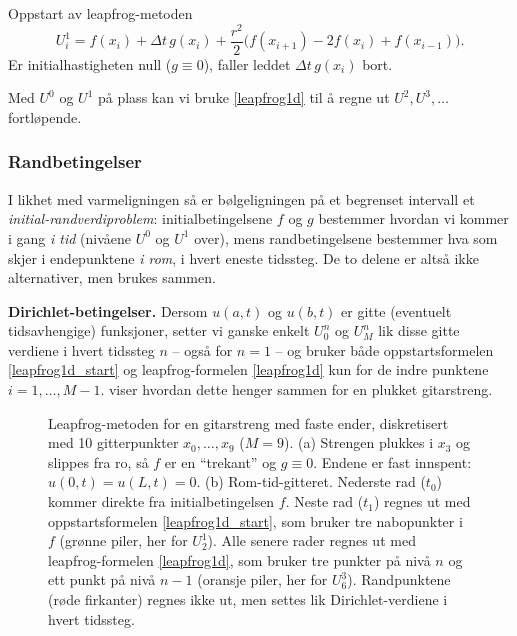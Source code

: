 \begin{oppsum}{Oppstart av leapfrog-metoden}
\begin{equation}\label{leapfrog1d_start}
U_i^1 = f(x_i) + \Delta t\, g(x_i) + \frac{r^2}{2}\big(f(x_{i+1})-2f(x_i)+f(x_{i-1})\big).
\end{equation}
Er initialhastigheten null ($g\equiv 0$), faller leddet $\Delta t\,g(x_i)$ bort.
\end{oppsum}

Med $U^0$ og $U^1$ på plass kan vi bruke \eqref{leapfrog1d} til å regne ut $U^2, U^3, \ldots$ fortløpende.

\subsubsection*{Randbetingelser}
I likhet med varmeligningen så er bølgeligningen på et begrenset intervall et \emph{initial-randverdiproblem}: initialbetingelsene $f$ og $g$ bestemmer hvordan vi kommer i gang \emph{i tid} (nivåene $U^0$ og $U^1$ over), mens randbetingelsene bestemmer hva som skjer i endepunktene \emph{i rom}, i hvert eneste tidssteg. De to delene er altså ikke alternativer, men brukes sammen.

\textbf{Dirichlet-betingelser.} Dersom $u(a,t)$ og $u(b,t)$ er gitte (eventuelt tidsavhengige) funksjoner, setter vi ganske enkelt $U_0^n$ og $U_M^n$ lik disse gitte verdiene i hvert tidssteg $n$ -- også for $n=1$ -- og bruker både oppstartsformelen \eqref{leapfrog1d_start} og leapfrog-formelen \eqref{leapfrog1d} kun for de indre punktene $i=1,\ldots,M-1$.  viser hvordan dette henger sammen for en plukket gitarstreng.

\begin{figure}[htbp]
\centering

\caption{Leapfrog-metoden for en gitarstreng med faste ender, diskretisert med 10 gitterpunkter $x_0,\ldots,x_9$ ($M=9$). (a) Strengen plukkes i $x_3$ og slippes fra ro, så $f$ er en ``trekant'' og $g\equiv0$. Endene er fast innspent: $u(0,t)=u(L,t)=0$. (b) Rom-tid-gitteret. Nederste rad ($t_0$) kommer direkte fra initialbetingelsen $f$. Neste rad ($t_1$) regnes ut med oppstartsformelen \eqref{leapfrog1d_start}, som bruker tre nabopunkter i $f$ (grønne piler, her for $U_2^1$). Alle senere rader regnes ut med leapfrog-formelen \eqref{leapfrog1d}, som bruker tre punkter på nivå $n$ og ett punkt på nivå $n-1$ (oransje piler, her for $U_6^3$). Randpunktene (røde firkanter) regnes ikke ut, men settes lik Dirichlet-verdiene i hvert tidssteg.}
\label{fig:leapfrog_gitar}
\end{figure}

